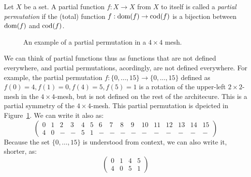 \begin{defn}
Let $X$ be a set.
A partial function $f: X \rightarrow X$ from $X$ to itself is called a \emph{partial permutation} if the (total) function $f: \operatorname{dom}(f) \rightarrow \operatorname{cod}(f)$ is a bijection between $\operatorname{dom}(f)$ and $\operatorname{cod}(f)$.
\end{defn}

\begin{figure}[h]
	\centering
   \resizebox{0.55\textwidth}{!}{}
	\caption{An example of a partial permutation in a $4 \times 4$ mesh.}
	\label{fig:example_partial_permutation}
\end{figure}

We can think of partial functions thus as functions that are not defined everywhere, and partial permutations, acordingly, are not defined everywhere.
For example, the partial permutation $f : \{0,\ldots,15\} \rightarrow \{0,\ldots,15\}$ defined as $f(0) = 4, f(1) = 0, f(4) = 5, f(5) = 1$ is a rotation of the upper-left $2 \times 2$-mesh in the $4\times 4$-mesh, but is not defined on the rest of the architecure. This is a partial symmetry of the $4\times 4$-mesh. This partial permutation is dpeicted in Figure~\ref{fig:example_partial_permutation}. We can write it also as:
\begin{equation*}
\left(
\begin{array}{llllllllllllllll}
0 & 1 & 2 & 3 & 4 & 5 & 6 & 7 & 8 & 9 & 10 & 11 & 12 & 13 & 14 & 15\\
4 & 0 & - & - & 5 & 1 & - & - & - & - &  - &  - &  - &  - &  - &  -
\end{array}
\right)
\end{equation*}
Because the set $\{0,\ldots,15\}$ is understood from context, we can also write it, shorter, as:
\begin{equation*}
\left(
\begin{array}{llll}
0 & 1 & 4 & 5 \\
4 & 0 &  5 & 1
\end{array}
\right)
\end{equation*}

